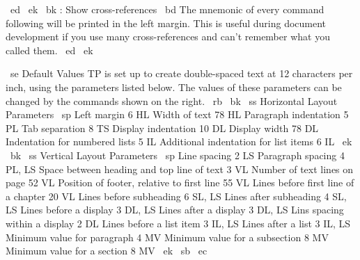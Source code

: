 ~ed ~ek ~bk \ZR: Show cross-references
~bd The mnemonic of every \MR command following \ZR will be printed
in the left margin.
This is useful during document development if you use many cross-references
and can't remember what you called them.
~ed ~ek

~se Default Values
TP is set up to create double-spaced text at 12 characters per inch,
using the parameters listed below.
The values of these parameters can be changed by the commands shown on 
the right.
~rb ~bk ~ss Horizontal Layout Parameters
~sp
Left margin                                   6    HL
Width of text                                78    HL
Paragraph indentation                         5    PL
Tab separation                                8    TS
Display indentation                          10    DL
Display width                                78    DL
Indentation for numbered lists                5    IL
Additional indentation for list items         6    IL
~ek
~bk ~ss Vertical Layout Parameters
~sp
Line spacing                                  2    LS
Paragraph spacing                             4    PL, LS
Space between heading and top line of text    3    VL
Number of text lines on page                 52    VL
Position of footer, relative to first line   55    VL
Lines before first line of a chapter         20    VL
Lines before subheading                       6    SL, LS
Lines after subheading                        4    SL, LS
Lines before a display                        3    DL, LS
Lines after a display                         3    DL, LS
Lins spacing within a display                 2    DL
Lines before a list item                      3    IL, LS
Lines after a list                            3    IL, LS
Minimum value for paragraph                   4    MV
Minimum value for a subsection                8    MV
Minimum value for a section                   8    MV
~ek ~sb ~ec \
